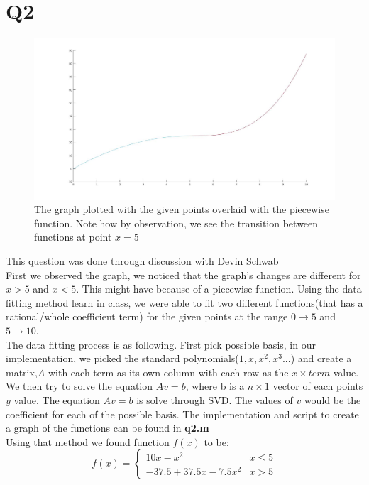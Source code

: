\documentclass{article}
\begin{document}
\section{Q2}
\begin{figure}[H]
\centering
\includegraphics[width=5in]{figures/q2.jpg}
\caption{The graph plotted with the given points overlaid with the piecewise function. Note how by observation, we see the transition between functions at point $x=5$}
\end{figure}
This question was done through discussion with Devin Schwab\\
First we observed the graph, we noticed that the graph's changes are different for $x > 5$ and $x < 5$. This might have because of a piecewise function. Using the data fitting method learn in class, we were able to fit two different functions(that has a rational/whole coefficient term) for the given points at the range $0 \rightarrow 5$ and $5 \rightarrow 10$.\\
The data fitting process is as following. First pick possible basis, in our implementation, we picked the standard polynomials($1,x,x^2,x^3 ...$) and create a matrix,$A$ with each term as its own column with each row as the $x \times term$ value. We then try to solve the equation $Av=b$, where b is a $n\times1$ vector of each points $y$ value. The equation $Av=b$ is solve through SVD. The values of $v$ would be the coefficient for each of the possible basis. The implementation and script to create a graph of the functions can be found in \textbf{q2.m}\\
Using that method we found function $f(x)$ to be:
\begin{equation*}
	f(x) = 
\begin{cases}
10x-x^2 & x \leq 5\\
-37.5 + 37.5x - 7.5x^2 & x > 5
\end{cases}
\end{equation*}
\end{document}
